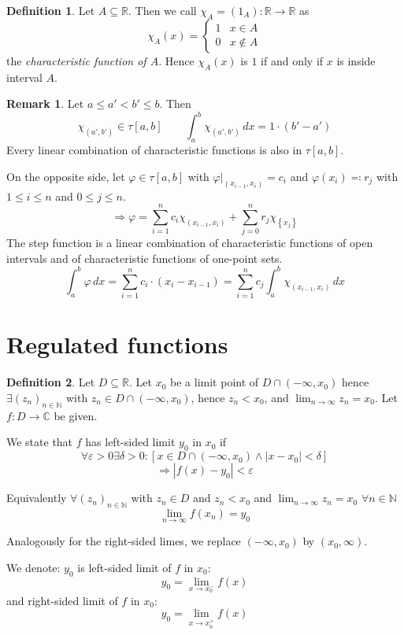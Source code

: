 \documentclass[a4paper,landscape,twocolumn]{article}
\theoremstyle{definition}
\newtheorem{defi}{Definition}
\newtheorem{rem}{Remark}
\newcommand\set[1]{\left\{#1\right\}}
\newcommand\abs[1]{\left|#1\right|}
\begin{document}
\begin{defi}
  Let $A \subseteq \mathbb R$. Then we call $\chi_A = (\mathcal 1_A): \mathbb R \to \mathbb R$ as
  \[ \chi_A(x) = \begin{cases} 1 & x \in A \\ 0 & x \not\in A \end{cases} \]
  the \emph{characteristic function of $A$}. Hence $\chi_A(x)$ is $1$ if and only if $x$ is inside interval $A$.
\end{defi}
\begin{rem}
  Let $a \leq a' < b' \leq b$. Then
  \[ \chi_{(a',b')} \in \tau[a,b] \qquad \int_a^b \chi_{(a',b')} \, dx = 1 \cdot (b' - a') \]
  Every linear combination of characteristic functions is also in $\tau[a,b]$.

  On the opposite side, let $\varphi \in \tau[a,b]$ with $\varphi|_{(x_{i-1},x_i)} = c_i$
  and $\varphi(x_i) \eqqcolon r_j$ with $1 \leq i \leq n$ and $0 \leq j \leq n$.
  \[
    \Rightarrow \varphi = \sum_{i=1}^n c_i \chi_{(x_{i-1},x_i)}
    + \sum_{j=0}^n r_j \chi_{\set{x_j}}
  \]
  The step function is a linear combination of characteristic functions
  of open intervals and of characteristic functions of one-point sets.
  \[
    \int_a^b \varphi \, dx
    = \sum_{i=1}^n c_i \cdot (x_i - x_{i-1})
    = \sum_{i=1}^n c_j \int_a^b \chi_{(x_{i-1},x_i)} \, dx
  \]
\end{rem}

\section{Regulated functions}

\begin{defi}
  Let $D \subseteq \mathbb R$. Let $x_0$ be a limit point of $D \cap (-\infty, x_0)$
  hence $\exists (z_n)_{n \in \mathbb N}$ with $z_n \in D \cap (-\infty, x_0)$,
  hence $z_n < x_0$, and $\lim_{n\to\infty} z_n = x_0$.
  Let $f: D \to \mathbb C$ be given.

  We state that $f$ has left-sided limit $y_0$ in $x_0$ if
  \[ \forall \varepsilon > 0 \exists \delta > 0: \left[x \in D \cap (-\infty, x_0) \land \abs{x - x_0} < \delta \right] \]
  \[ \Rightarrow \abs{f(x) - y_0} < \varepsilon \]

  Equivalently $\forall (z_n)_{n\in\mathbb N}$ with $z_n \in D$
  and $z_n < x_0$ and $\lim_{n\to\infty} z_n = x_0$ $\forall n \in \mathbb N$
  \[ \lim_{n\to\infty} f(x_n) = y_0 \]

  Analogously for the right-sided limes, we replace $(-\infty, x_0)$ by $(x_0, \infty)$.

  We denote: $y_0$ is left-sided limit of $f$ in $x_0$:
  \[ y_0 = \lim_{x\to x_0^-} f(x) \]
  and right-sided limit of $f$ in $x_0$:
  \[ y_0 = \lim_{x\to x_0^+} f(x) \]
\end{defi}
\end{document}
